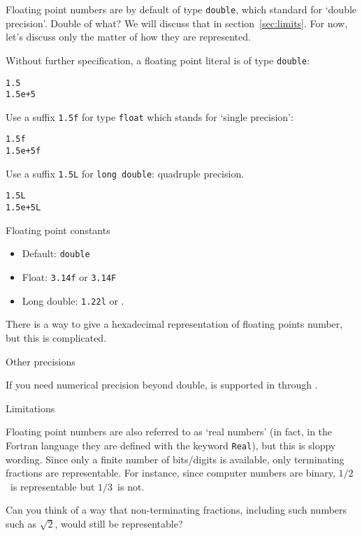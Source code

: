 Floating point numbers are by default of type \lstinline{double},
which standard for `double precision'. Double of what?
We will discuss that in section~\ref{sec:limits}.
For now, let's discuss only the matter of how they are represented.

Without further specification, a floating point literal is of type \lstinline{double}:
\begin{lstlisting}
1.5
1.5e+5
\end{lstlisting}
Use a suffix  \lstinline{1.5f} for type \lstinline{float} which stands for `single precision':
\begin{lstlisting}
1.5f
1.5e+5f
\end{lstlisting}
Use a suffix  \lstinline{1.5L} for \lstinline{long double}: quadruple precision.
\begin{lstlisting}
1.5L
1.5e+5L
\end{lstlisting}

\begin{slide}{Floating point constants}
  \label{sl:float-vars}
  \begin{itemize}
  \item Default: \lstinline{double}
  \item Float: \lstinline{3.14f} or \lstinline{3.14F}
  \item Long double: \lstinline{1.22l} or .
  \end{itemize}
\end{slide}

There is a way to give a 
hexadecimal representation of floating points number, but this is complicated.

 {Other precisions}

If you need numerical precision beyond double,
is supported in  through .

 {Limitations}

Floating point numbers are also referred to as `real numbers'
(in fact, in the Fortran language they are defined
with the keyword \lstinline{Real}),
but this is sloppy wording.
Since only a finite number of bits/digits is available,
only terminating fractions are representable.
For instance, since computer numbers are binary,
$1/2$~is representable but $1/3$~is not.

\begin{exercise}
  \label{ex:float-irrat}
  Can you think of a way that non-terminating fractions,
  including such numbers such as $\sqrt 2$,
  would still be representable?
\end{exercise}

